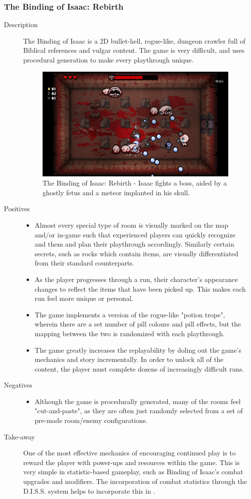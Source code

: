 \clearpage
\subsubsection{The Binding of Isaac: Rebirth}
\begin{description}
\item[Description]{The Binding of Isaac is a 2D bullet-hell, rogue-like, dungeon crawler full of Biblical references and vulgar content. The game is very difficult, and uses procedural generation to make every playthrough unique.

\begin{figure}[htb]
	\centering\includegraphics[width=.25\linewidth]{images/game_isaac}
	\caption{The Binding of Isaac: Rebirth - Isaac fights a boss, aided by a ghostly fetus and a meteor implanted in his skull.}
	\label{fig:binding_of_isaac}
\end{figure}}
\item[Positives]{
\begin{itemize}
\item{Almost every special type of room is visually marked on the map and/or in-game such that experienced players can quickly recognize and them and plan their playthrough accordingly. Similarly certain secrets, such as rocks which contain items, are visually differentiated from their standard counterparts.}
\item{As the player progresses through a run, their character's appearance changes to reflect the items that have been picked up. This makes each run feel more unique or personal.}
\item{The game implements a version of the rogue-like "potion trope", wherein there are a set number of pill colours and pill effects, but the mapping between the two is randomized with each playthrough.}
\item{The game greatly increases the replayability by doling out the game's mechanics and story incrementally. In order to unlock all of the content, the player must complete dozens of increasingly difficult runs.}
\end{itemize}
}
\item[Negatives]{
\begin{itemize}
\item{Although the game is procedurally generated, many of the rooms feel "cut-and-paste", as they are often just randomly selected from a set of pre-made room/enemy configurations.}
\end{itemize}
}
\item[Take-away]{One of the most effective mechanics of encouraging continued play is to reward the player with power-ups and resources within the game. This is very simple in statistic-based gameplay, such as Binding of Isaac's combat upgrades and modifiers. The incorporation of combat statistics through the D.I.S.S. system helps \ourteam{} to incorporate this in \ourgame{}.}
\end{description}



